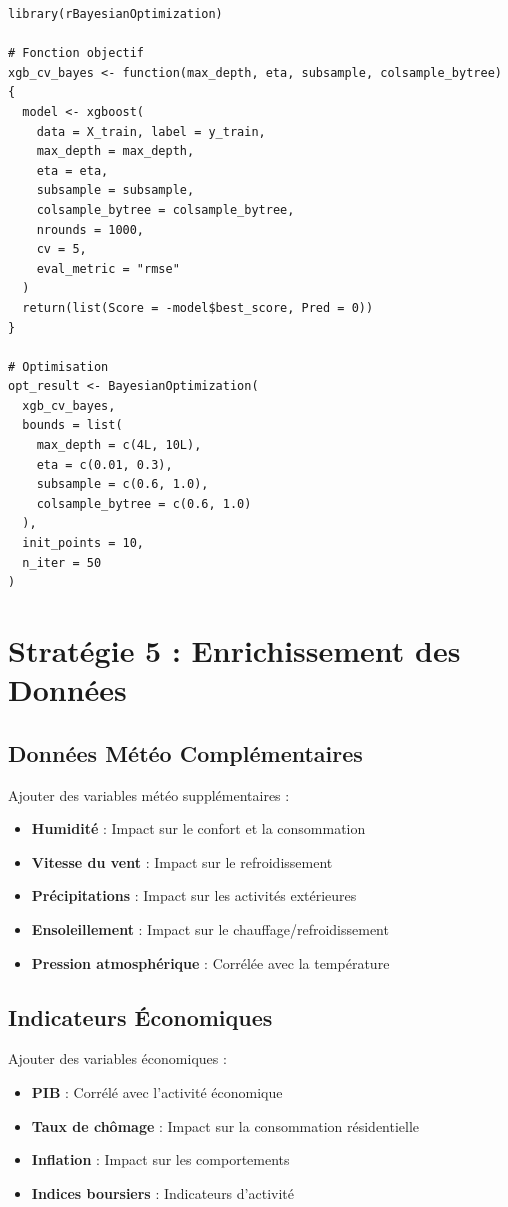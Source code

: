\documentclass[12pt,a4paper]{article}
\begin{document}
\begin{verbatim}
library(rBayesianOptimization)

# Fonction objectif
xgb_cv_bayes <- function(max_depth, eta, subsample, colsample_bytree) {
  model <- xgboost(
    data = X_train, label = y_train,
    max_depth = max_depth,
    eta = eta,
    subsample = subsample,
    colsample_bytree = colsample_bytree,
    nrounds = 1000,
    cv = 5,
    eval_metric = "rmse"
  )
  return(list(Score = -model$best_score, Pred = 0))
}

# Optimisation
opt_result <- BayesianOptimization(
  xgb_cv_bayes,
  bounds = list(
    max_depth = c(4L, 10L),
    eta = c(0.01, 0.3),
    subsample = c(0.6, 1.0),
    colsample_bytree = c(0.6, 1.0)
  ),
  init_points = 10,
  n_iter = 50
)
\end{verbatim}

\section{Stratégie 5 : Enrichissement des Données}

\subsection{Données Météo Complémentaires}

Ajouter des variables météo supplémentaires :

\begin{itemize}
    \item \textbf{Humidité} : Impact sur le confort et la consommation
    \item \textbf{Vitesse du vent} : Impact sur le refroidissement
    \item \textbf{Précipitations} : Impact sur les activités extérieures
    \item \textbf{Ensoleillement} : Impact sur le chauffage/refroidissement
    \item \textbf{Pression atmosphérique} : Corrélée avec la température
\end{itemize}

\subsection{Indicateurs Économiques}

Ajouter des variables économiques :

\begin{itemize}
    \item \textbf{PIB} : Corrélé avec l'activité économique
    \item \textbf{Taux de chômage} : Impact sur la consommation résidentielle
    \item \textbf{Inflation} : Impact sur les comportements
    \item \textbf{Indices boursiers} : Indicateurs d'activité
\end{itemize}
\end{document}
